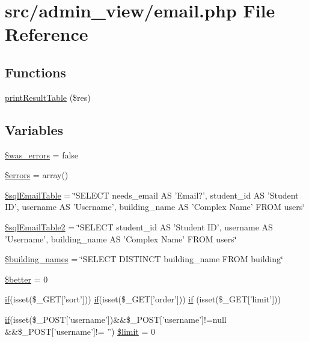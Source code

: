 \hypertarget{email_8php}{\section{src/admin\-\_\-view/email.php \-File \-Reference}
\label{email_8php}
}
\subsection*{\-Functions}
\begin{DoxyCompactItemize}
\item 
\hyperlink{email_8php_a53a1cdeb72daf429352ba4732b6d08ce}{print\-Result\-Table} (\$res)
\end{DoxyCompactItemize}
\subsection*{\-Variables}
\begin{DoxyCompactItemize}
\item 
\hyperlink{email_8php_ae8f928f475945454d3cfd1d4214c09f2}{\$was\-\_\-errors} = false
\item 
\hyperlink{email_8php_ab24faf4aa647cdcee494fc48524ad4ff}{\$errors} = array()
\item 
\hyperlink{email_8php_a4eac19f61e471744dca8807b9f9c965c}{\$sql\-Email\-Table} = \char`\"{}\-S\-E\-L\-E\-C\-T needs\-\_\-email \-A\-S '\-Email?', student\-\_\-id \-A\-S '\-Student \-I\-D', username \-A\-S '\-Username', building\-\_\-name \-A\-S '\-Complex \-Name' \-F\-R\-O\-M users\char`\"{}
\item 
\hyperlink{email_8php_ac3b358280147913d285c50c83ac0b9a4}{\$sql\-Email\-Table2} = \char`\"{}\-S\-E\-L\-E\-C\-T student\-\_\-id \-A\-S '\-Student \-I\-D', username \-A\-S '\-Username', building\-\_\-name \-A\-S '\-Complex \-Name' \-F\-R\-O\-M users\char`\"{}
\item 
\hyperlink{email_8php_a8ab55fcf525cc50064165d5b3e77e9a5}{\$building\-\_\-names} = \char`\"{}\-S\-E\-L\-E\-C\-T \-D\-I\-S\-T\-I\-N\-C\-T building\-\_\-name \-F\-R\-O\-M building\char`\"{}
\item 
\hyperlink{email_8php_ae3232bcce9a4bbba3be65673e18de049}{\$better} = 0
\item 
\hyperlink{updateBenchDB_8php_a0c1f2915e12defa9f4d515347d884dee}{if}(isset(\$\-\_\-\-G\-E\-T\mbox{[}'sort'\mbox{]})) \hyperlink{updateBenchDB_8php_a0c1f2915e12defa9f4d515347d884dee}{if}(isset(\$\-\_\-\-G\-E\-T\mbox{[}'order'\mbox{]})) \hyperlink{email_8php_aea6d4532c33261281e47f8368257f1a9}{if} (isset(\$\-\_\-\-G\-E\-T\mbox{[}'limit'\mbox{]}))
\item 
\hyperlink{updateBenchDB_8php_a0c1f2915e12defa9f4d515347d884dee}{if}(isset(\$\-\_\-\-P\-O\-S\-T\mbox{[}'username'\mbox{]})\&\&\$\-\_\-\-P\-O\-S\-T\mbox{[}'username'\mbox{]}!=null \*
\&\&\$\-\_\-\-P\-O\-S\-T\mbox{[}'username'\mbox{]}!= '') \hyperlink{email_8php_a0789d16925b198a139a7f9ea25fe4351}{\$limit} = 0
\end{DoxyCompactItemize}


